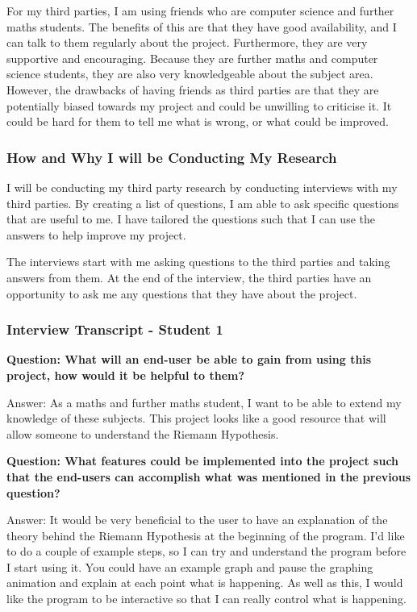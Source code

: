 \documentclass{article}
\begin{document}
For my third parties, I am using friends who are computer science and further maths students. The benefits of this are that they have good availability, and I can talk to them regularly about the project. Furthermore, they are very supportive and encouraging. Because they are further maths and computer science students, they are also very knowledgeable about the subject area. However, the drawbacks of having friends as third parties are that they are potentially biased towards my project and could be unwilling to criticise it. It could be hard for them to tell me what is wrong, or what could be improved.

\subsubsection{How and Why I will be Conducting My Research}
I will be conducting my third party research by conducting interviews with my third parties. By creating a list of questions, I am able to ask specific questions that are useful to me. I have tailored the questions such that I can use the answers to help improve my project.

The interviews start with me asking questions to the third parties and taking answers from them. At the end of the interview, the third parties have an opportunity to ask me any questions that they have about the project.

\subsubsection{Interview Transcript - Student 1}

\textbf{Question: What will an end-user be able to gain from using this project, how would it be helpful to them?}

Answer: As a maths and further maths student, I want to be able to extend my knowledge of these subjects. This project looks like a good resource that will allow someone to understand the Riemann Hypothesis.

\textbf{Question: What features could be implemented into the project such that the end-users can accomplish what was mentioned in the previous question?}

Answer: It would be very beneficial to the user to have an explanation of the theory behind the Riemann Hypothesis at the beginning of the program. I'd like to do a couple of example steps, so I can try and understand the program before I start using it. You could have an example graph and pause the graphing animation and explain at each point what is happening. As well as this, I would like the program to be interactive so that I can really control what is happening.
\end{document}
